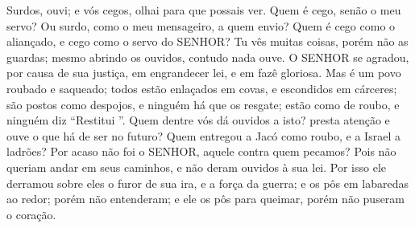 {  Surdos, ouvi; e vós cegos, olhai para que possais ver.
  Quem é cego, senão o meu servo? Ou surdo, como o meu mensageiro, a quem envio? Quem é cego como o aliançado,
 e cego como o servo do SENHOR?
  Tu vês muitas coisas, porém não as guardas; mesmo abrindo os ouvidos, contudo nada ouve.
  O SENHOR se agradou, por causa de sua justiça, em engrandecer
{} lei, e em fazê
{} gloriosa.
  Mas
{} é um povo roubado e saqueado; todos estão enlaçados em covas, e escondidos em cárceres; são postos como despojos, e ninguém há que os resgate; estão como
{} de roubo, e ninguém diz “Restitui
{} ”.
  Quem dentre vós dá ouvidos a isto?
{} presta atenção e ouve o que há de ser no futuro?
  Quem entregou a Jacó como roubo, e a Israel a ladrões? Por acaso não foi o SENHOR, aquele contra quem pecamos? Pois não queriam andar em seus caminhos, e não deram ouvidos à sua lei.
  Por isso ele derramou sobre eles o furor de sua ira, e a força da guerra; e os pôs em labaredas ao redor; porém
{} não entenderam; e ele os pôs para queimar, porém
{} não puseram
{} o coração.
\par }

